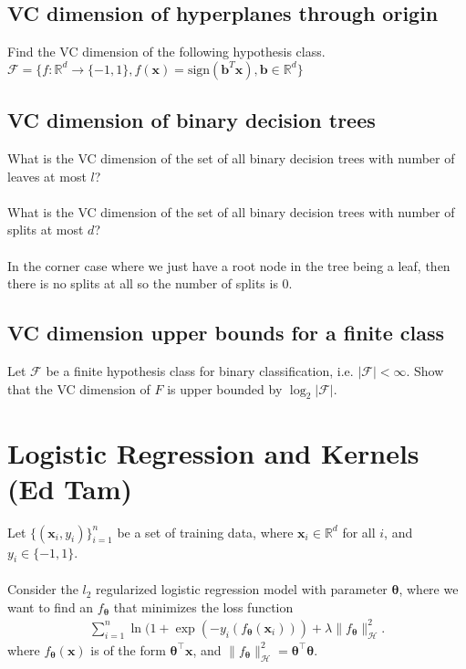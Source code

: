 \documentclass{exam}
\begin{document}
\subsection{VC dimension of hyperplanes through origin}
Find the VC dimension of the following hypothesis class. 
$\mathcal{F} = \{f : \mathbb{R}^d \to \{-1, 1\}, f(\mathbf{x}) = \textrm{sign}(\mathbf{b}^T \mathbf{x}), \mathbf{b} \in \mathbb{R}^d\}$

\subsection{VC dimension of binary decision trees} 
What is the VC dimension of the set of all binary decision trees with number of leaves at most $l$?
\\\\What is the VC dimension of the set of all binary decision trees with number of splits at most $d$? 
\\\\In the corner case where we just have a root node in the tree being a leaf, then there is no splits at all so the number of splits is 0.
\subsection{VC dimension upper bounds for a finite class}
Let $\mathcal{F}$ be a finite hypothesis class for binary classification, i.e. $|\mathcal{F}| < \infty$. Show that the VC dimension of $F$ is upper bounded by $\log_2|\mathcal{F}|$.

\section{Logistic Regression and Kernels (Ed Tam)}
Let $\{(\mathbf{x}_i, y_i)\}_{i = 1}^n$ be a set of training data, where $\mathbf{x}_i \in \mathbb{R}^d$ for all $i$, and $y_i\in\{-1,1\}$. 
\\\\Consider the $l_2$ regularized logistic regression model with parameter $\bm\theta$, where we want to find an $f_{\bm\theta}$ that minimizes the loss function 
\begin{align*}
\sum_{i=1}^n \ln(1+\exp(-y_i(f_{\bm\theta}(\mathbf{x}_i))) + \lambda\|f_{\bm\theta}\|_{\mathcal{H}}^2 .
\end{align*} 
where $f_{\bm\theta}(\mathbf{x})$ is of the form $\bm\theta^\top\mathbf{x}$, and $\|f_{\bm\theta}\|_{\mathcal{H}}^2=\bm\theta^\top\bm\theta$. 
\end{document}
